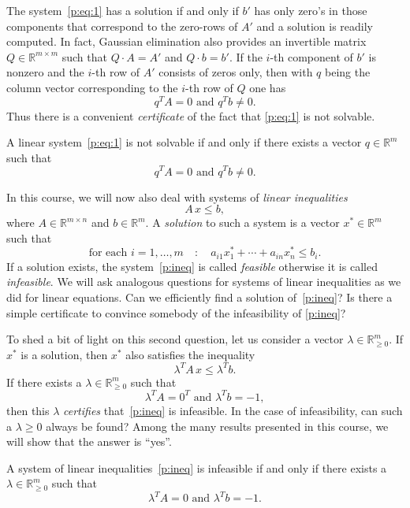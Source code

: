 \documentclass[11pt,envcountchap,pdf]{svmono}
\renewcommand{\leq}{\leqslant}
\begin{document}
The system~\eqref{p:eq:1} has a solution if and only if ${b}'$ has only zero's in those components that correspond to the zero-rows of ${A}'$ and a solution is readily computed. In fact, Gaussian elimination also provides an invertible matrix $Q ∈ ℝ^{m ×m}$ such that $Q\cdot A = {A}'$ and $Q \cdot b = {b}'$. If the $i$-th component of ${b}'$ is nonzero and the $i$-th row of ${A}'$ consists of zeros only, then with $q$ being the column vector corresponding to the $i$-th row of $Q$ one has 
\begin{displaymath}
  q^T A = 0 \text{ and } q^Tb \neq 0. 
\end{displaymath}
Thus there is a convenient \emph{certificate} of the fact that \eqref{p:eq:1} is not solvable. 


\begin{theorem}
  \label{thr:8}
  A linear system~\eqref{p:eq:1} is not solvable if and only if there exists a vector $q ∈ ℝ^m$ such that 
  \begin{displaymath}
    q^T A = 0 \text{ and } q^T b \neq 0. 
  \end{displaymath}
\end{theorem}

In this course, we will now also deal with systems of \emph{linear inequalities} 
\begin{equation}
  \label{p:ineq}
  A \,x ≤ b,
\end{equation}
where $A ∈ ℝ^{m × n}$ and $b ∈ ℝ^m$. A \emph{solution} to such a system is a vector $x^* ∈ ℝ^m$ such that
\begin{equation}
  \label{p:sol}
 \text{for each } i=1,\dots,m \quad : \quad   a_{i1} x^*_1 + \cdots + a_{in} x^*_n \leq b_i.  
\end{equation}
If a solution exists, the system~\eqref{p:ineq} is called \emph{feasible} otherwise it is called \emph{infeasible}. 
We will ask analogous questions for  systems of linear inequalities as we did for linear equations. Can we efficiently find a solution of~\eqref{p:ineq}?  Is there a simple certificate to convince somebody of the infeasibility of \eqref{p:ineq}? 

To shed a bit of light on this second question, let us consider a vector $λ ∈ ℝ^m_{≥0}$. If $x^*$ is a solution, then $x^*$ also satisfies the inequality 
\begin{equation}
  \label{p:impli}
  λ^T A \, x ≤ λ^T b.
\end{equation}
If there exists a $λ \in ℝ^m_{≥0}$ such that 
\begin{equation}
  \label{p:Farkas}
  λ^T A = 0^T \text{ and } λ^T b = -1,
\end{equation}
then this $λ$ \emph{certifies} that~\eqref{p:ineq} is infeasible. In the case of infeasibility, can such a $λ≥0$ always be found? Among the many results presented in  this course,  we will show that the answer is ``yes''. 
\begin{theorem}
  \label{thr:7}
  A system of linear inequalities~\eqref{p:ineq} is infeasible if and only if there exists a $λ ∈ ℝ^m_{≥0}$ such that 
  \begin{displaymath}
    λ^T A = 0 \text{ and } λ^T b = -1.
  \end{displaymath}
\end{theorem}
\end{document}
